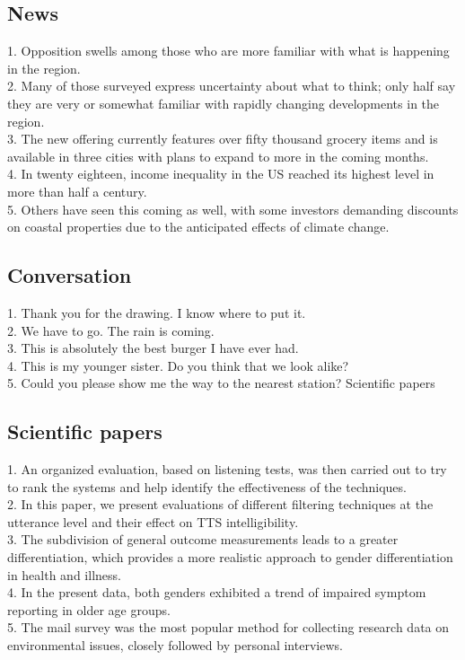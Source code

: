 \documentclass[12pt]{article}
\begin{document}
\subsection{News}
1.	Opposition swells among those who are more familiar with what is happening in the region.\\
2.	Many of those surveyed express uncertainty about what to think; only half say they are very or somewhat familiar with rapidly changing developments in the region.\\
3.	The new offering currently features over fifty thousand grocery items and is available in three cities with plans to expand to more in the coming months.\\
4.	In twenty eighteen, income inequality in the US reached its highest level in more than half a century.\\
5.	Others have seen this coming as well, with some investors demanding discounts on coastal properties due to the anticipated effects of climate change.

\subsection{Conversation}
1.	Thank you for the drawing. I know where to put it.\\
2.	We have to go. The rain is coming.\\
3.	This is absolutely the best burger I have ever had.\\
4.	This is my younger sister. Do you think that we look alike?\\
5.	Could you please show me the way to the nearest station?
Scientific papers

\subsection{Scientific papers}
1.	An organized evaluation, based on listening tests, was then carried out to try to rank the systems and help identify the effectiveness of the techniques.\\
2.	In this paper, we present evaluations of different filtering techniques at the utterance level and their effect on TTS intelligibility.\\
3.	The subdivision of general outcome measurements leads to a greater differentiation, which provides a more realistic approach to gender differentiation in health and illness.\\
4.	In the present data, both genders exhibited a trend of impaired symptom reporting in older age groups.\\
5.	The mail survey was the most popular method for collecting research data on environmental issues, closely followed by personal interviews.
\end{document}
